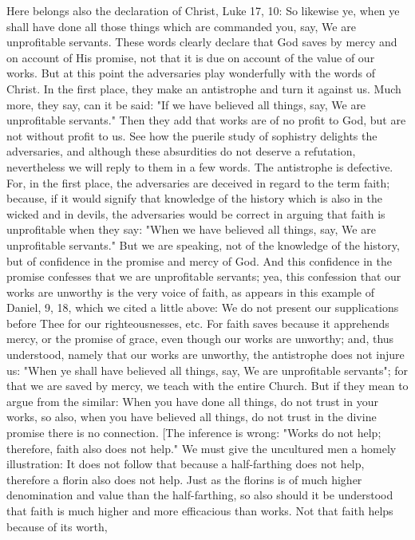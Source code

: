 Here belongs also the declaration of Christ, Luke 17, 10: So likewise
ye, when ye shall have done all those things which are commanded you,
say, We are unprofitable servants.  These words clearly declare that
God saves by mercy and on account of His promise, not that it is due
on account of the value of our works.  But at this point the
adversaries play wonderfully with the words of Christ.  In the first
place, they make an antistrophe and turn it against us.  Much more,
they say, can it be said: "If we have believed all things, say, We
are unprofitable servants." Then they add that works are of no profit
to God, but are not without profit to us.  See how the puerile study
of sophistry delights the adversaries, and although these absurdities
do not deserve a refutation, nevertheless we will reply to them in a
few words.  The antistrophe is defective.  For, in the first place,
the adversaries are deceived in regard to the term faith; because, if
it would signify that knowledge of the history which is also in the
wicked and in devils, the adversaries would be correct in arguing
that faith is unprofitable when they say: "When we have believed all
things, say, We are unprofitable servants." But we are speaking, not
of the knowledge of the history, but of confidence in the promise and
mercy of God.  And this confidence in the promise confesses that we
are unprofitable servants; yea, this confession that our works are
unworthy is the very voice of faith, as appears in this example of
Daniel, 9, 18, which we cited a little above: We do not present our
supplications before Thee for our righteousnesses, etc. For faith
saves because it apprehends mercy, or the promise of grace, even
though our works are unworthy; and, thus understood, namely that our
works are unworthy, the antistrophe does not injure us: "When ye
shall have believed all things, say, We are unprofitable servants";
for that we are saved by mercy, we teach with the entire Church.  But
if they mean to argue from the similar: When you have done all things,
do not trust in your works, so also, when you have believed all
things, do not trust in the divine promise there is no connection.
[The inference is wrong: "Works do not help; therefore, faith also
does not help." We must give the uncultured men a homely illustration:
It does not follow that because a half-farthing does not help,
therefore a florin also does not help.  Just as the florins is of
much higher denomination and value than the half-farthing, so also
should it be understood that faith is much higher and more
efficacious than works.  Not that faith helps because of its worth,
